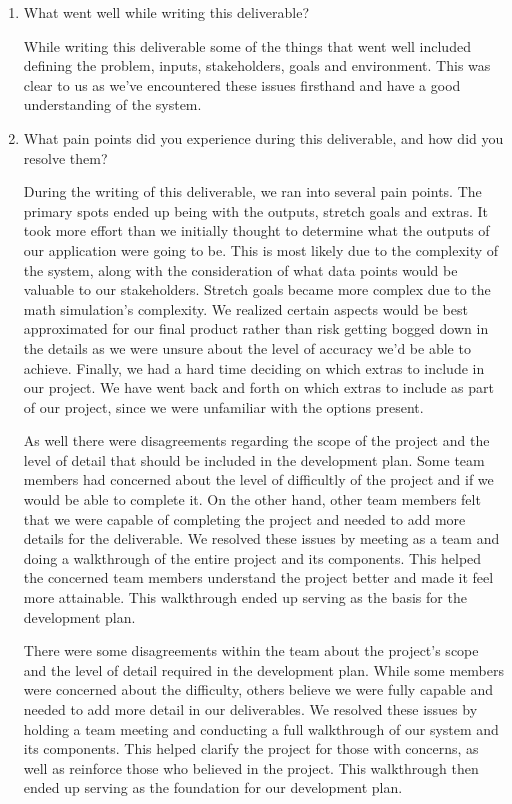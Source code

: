 \documentclass{article}
\begin{document}
\begin{enumerate}
    \item What went well while writing this deliverable? 

    While writing this deliverable some of the things that went well included
    defining the problem, inputs, stakeholders, goals and environment. This was clear to us as 
    we've encountered these issues firsthand and have a good understanding of the system.
    
    \item What pain points did you experience during this deliverable, and how
    did you resolve them?

    During the writing of this deliverable, we ran into several pain points. The primary spots 
    ended up being with the outputs, stretch goals and extras. It took more effort than we initially
    thought to determine what the outputs of our application were going to be. This is most likely
    due to the complexity of the system, along with the consideration of what data points would be valuable
    to our stakeholders. Stretch goals became more complex due to the math simulation's complexity. We realized
    certain aspects would be best approximated for our final product rather than risk getting bogged down in 
    the details as we were unsure about the level of accuracy we'd be able to achieve. Finally, we had a hard 
    time deciding on which extras to include in our project. We have went back and forth on which extras 
    to include as part of our project, since we were unfamiliar with the options present.

    As well there were disagreements regarding the scope of the project and the level of detail that should be included in the development plan. 
    Some team members had concerned about the level of difficultly of the project and if we would be able to complete it. On the other hand,
    other team members felt that we were capable of completing the project and needed to add more details for the deliverable.
    We resolved these issues by meeting as a team and doing a walkthrough of the entire project and its components.
    This helped the concerned team members understand the project better and made it feel more attainable. 
    This walkthrough ended up serving as the basis for the development plan.

    There were some disagreements within the team about the project's scope and the level of detail required in the development plan.
    While some members were concerned about the difficulty, others believe we were fully capable and needed to add more detail in our deliverables.
    We resolved these issues by holding a team meeting and conducting a full walkthrough of our system and its components. This helped clarify the project
    for those with concerns, as well as reinforce those who believed in the project. This walkthrough then ended up serving as the foundation for our 
    development plan.
    

\end{enumerate}
\end{document}
